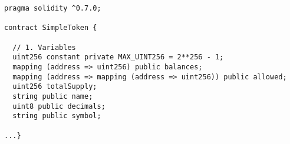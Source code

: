 \begin{lstlisting}[language=Solidity]
pragma solidity ^0.7.0;

contract SimpleToken {

  // 1. Variables
  uint256 constant private MAX_UINT256 = 2**256 - 1;
  mapping (address => uint256) public balances;
  mapping (address => mapping (address => uint256)) public allowed;
  uint256 totalSupply;
  string public name;                   
  uint8 public decimals;                
  string public symbol;
    
...}
\end{lstlisting}